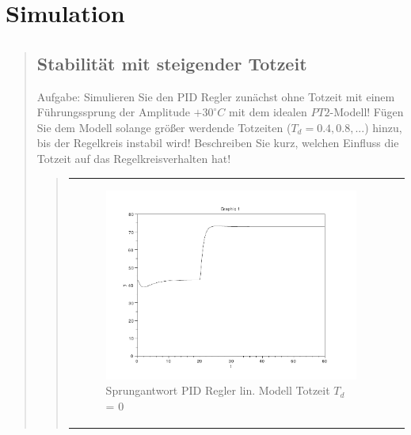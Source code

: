 \section{Simulation}
\begin{quote}
    
    
    
    \subsection{Stabilität mit steigender Totzeit}
    \begin{quote}
        
    \end{quote}
    Aufgabe:%
    Simulieren Sie den PID Regler zunächst ohne Totzeit mit einem Führungssprung der Amplitude $+30^{\circ}C$ mit dem
    idealen $PT2$-Modell! Fügen Sie dem Modell solange größer werdende Totzeiten ($T_d = 0.4, 0.8, . . .$) hinzu, bis
    der Regelkreis instabil wird! Beschreiben Sie kurz, welchen Einfluss die Totzeit auf das Regelkreisverhalten
    hat!%
    
    \begin{quote}
            \begin{center}
                \begin{tabular}{ll}
                
                \hspace{-1cm}
                    \begin{minipage}{0.6\textwidth}
                        \begin{figure}[H]
                            \includegraphics[scale=0.4, trim = 0cm 0cm 0cm
                            0cm, clip]
                            {./Bilder/4_1_Td_0}
                              \caption{Sprungantwort PID Regler lin. Modell Totzeit $T_d$ = 0}
                        \end{figure}
                    \end{minipage}
                    

\end{tabular}
\end{center}
\end{quote}
\end{quote}
